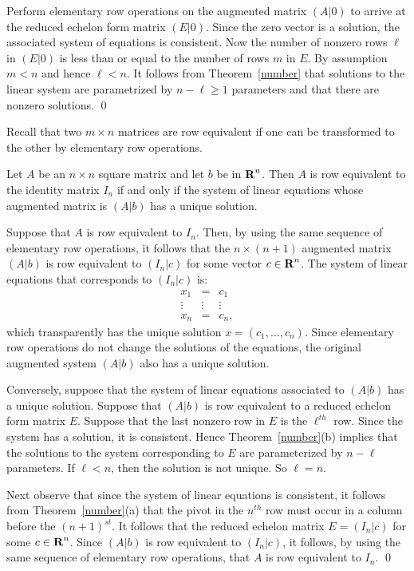\proof Perform elementary row operations on the augmented matrix $(A|0)$
to arrive at the reduced echelon form matrix $(E|0)$.  Since the zero
vector is a solution, the associated system of equations is consistent.
Now the number of nonzero rows $\ell$ in $(E|0)$ is less than or equal to
the number of rows $m$ in $E$.  By assumption $m<n$ and hence $\ell<n$.
It follows from Theorem~\ref{number} that solutions to the linear system
are parametrized by $n-\ell \ge 1$ parameters and that there are nonzero
solutions.   \qed

Recall that two $m\times n$ matrices are row equivalent if one
can be transformed to the other by elementary row operations.

\begin{cor}  \label{consistent}
Let $A$ be an $n\times n$ square matrix and let $b$ be in
$\mbox{$\bf{R}$}^n$.  Then $A$ is row equivalent to the identity matrix $I_n$
if and only if the system of linear equations whose augmented
matrix is $(A|b)$ has a unique solution.
\end{cor}   

\proof	Suppose that $A$ is row equivalent to $I_n$.  Then, by using
the same sequence of elementary row operations, it follows that
the $n\times (n+1)$ augmented matrix $(A|b)$ is row equivalent
to $(I_n|c)$ for some vector $c\in\mbox{$\bf{R}$}^n$.  The system of linear
equations that corresponds to $(I_n|c)$ is:
\[
\begin{array}{ccc}
x_1 & = & c_1 \\
\vdots & \vdots & \vdots \\
x_n & = & c_n,
\end{array}
\]
which transparently has the unique solution $x=(c_1,\ldots,c_n)$.
Since elementary row operations do not change the solutions of
the equations, the original augmented system $(A|b)$ also has a
unique solution.

Conversely, suppose that the system of linear equations
associated to $(A|b)$ has a unique solution.  Suppose that
$(A|b)$ is row equivalent to a reduced echelon form matrix $E$.
Suppose that the last nonzero row in $E$ is the $\ell^{th}$ row.
Since the system has a solution, it is consistent.  Hence
Theorem~\ref{number}(b) implies that the solutions to the system
corresponding to $E$ are parameterized by $n-\ell$ parameters.
If $\ell<n$, then the solution is not unique.  So $\ell=n$.

Next observe that since the system of linear equations is
consistent, it follows from Theorem~\ref{number}(a) that the
pivot in the $n^{th}$ row must occur in a column before the
$(n+1)^{st}$.  It follows that the reduced echelon matrix
$E=(I_n|c)$ for some $c\in\mbox{$\bf{R}$}^n$.  Since $(A|b)$ is row
equivalent to $(I_n|c)$, it follows, by using the same sequence
of elementary row operations, that $A$ is row equivalent to
$I_n$.  \qed

